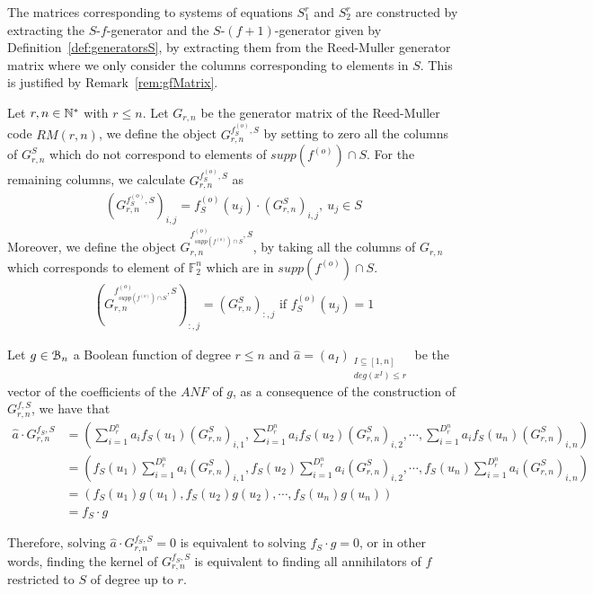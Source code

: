 \documentclass[11pt]{llncs}
\begin{document}
The matrices corresponding to systems of equations $S_1^r$ and $S_2^r$ are constructed by extracting the $S$-$f$-generator and the $S$-$(f+1)$-generator given by Definition~\ref{def:generatorsS}, by extracting them from the Reed-Muller generator matrix where we only consider the columns corresponding to elements in $S$. 
This is justified by Remark~\ref{rem:gfMatrix}.



\begin{definition}\label{def:generatorsS}
Let $r,n\in\mathbb{N}^*$ with $r\leq n$. Let $G_{r,n}$ be the generator matrix of the Reed-Muller code $RM(r,n)$, we define the object $G_{r,n}^{f^{(o)}_S,S}$ by setting to zero all the columns of $G_{r,n}^S$ which do not correspond to elements of $supp(f^{(o)} )\cap S$. For the remaining columns, we calculate $G_{r,n}^{f_S^{(o)},S}$ as
	\begin{align*}
	\left(G_{r,n}^{f^{(o)}_S,S}\right)_{i,j} = f_S^{(o)}(u_j) \cdot \left(G_{r,n}^S\right)_{i,j}, \ u_j \in S
	\end{align*}
	Moreover, we define the object $G_{r,n}^{f^{(o)}_{supp\left(f^{(o)}\right) \cap S},S}$, by taking all the columns of $G_{r,n}$ which corresponds to element of $\mathbb{F}_2^n$ which are in $supp\left(f^{(o)}\right) \cap S$.
	\begin{align}
	\left(G_{r,n}^{f_{supp\left(f^{(o)}\right) \cap S}^{(o)},S}\right)_{:,j} = (G_{r,n}^S)_{:,j} \mbox{ if } f_S^{(o)}(u_j) = 1 \label{eq:f-generatorRestrictedSet}
	\end{align}
\end{definition}

\begin{remark}\label{rem:gfMatrix}
	Let $g \in \mathcal{B}_{n}$ a Boolean function of degree $r\leq n$ and $\hat{a} = \left(a_I\right)_{\substack{I \subseteq [1,n] \\ deg\left(x^I\right) \leq r}}$ be the vector of the coefficients of the $ANF$ of $g$, as a consequence of the construction of $G_{r,n}^{f,S}$, we have that
	\begin{equation}
	\begin{aligned}
	\hat{a} \cdot G_{r,n}^{f_S,S} & = \left(\sum_{i=1}^{D_r^n}a_i f_S(u_1)(G_{r,n}^S)_{i,1}, \sum_{i=1}^{D_r^n}a_i f_S(u_2)(G_{r,n}^S)_{i,2}, \cdots, \sum_{i=1}^{D_r^n}a_i f_S(u_n)(G_{r,n}^S)_{i,n}\right)     \\
	& =  \left(f_S(u_1) \sum_{i=1}^{D_r^n}a_i (G_{r,n}^S)_{i,1}, f_S(u_2) \sum_{i=1}^{D_r^n}a_i (G_{r,n}^S)_{i,2}, \cdots, f_S(u_n) \sum_{i=1}^{D_r^n}a_i (G_{r,n}^S)_{i,n}\right) \\
	& = \left(f_S(u_1) g(u_1), f_S(u_2) g(u_2), \cdots, f_S(u_n) g(u_n)\right)                                                                                      \\
	& = f_S \cdot g
	\end{aligned}
	\end{equation}
	
	Therefore, solving $ \hat{a} \cdot G_{r,n}^{f_S,S} = 0$ is equivalent to solving $f_S \cdot g = 0$, or in other words, finding the kernel of $G_{r,n}^{f_S,S}$ is equivalent to finding all annihilators of $f$ restricted to $S$ of degree up to $r$.
\end{remark}
\end{document}
